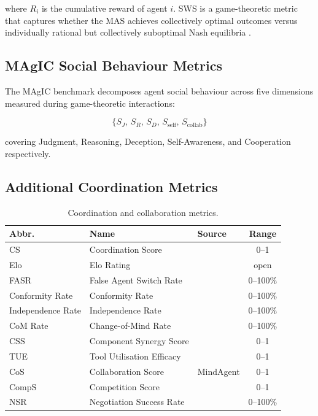 \documentclass[11pt,a4paper]{article}
\begin{document}
where $R_i$ is the cumulative reward of agent $i$. SWS is a game-theoretic metric that
captures whether the MAS achieves collectively optimal outcomes versus individually
rational but collectively suboptimal Nash equilibria \citep{game_theoretic_mas2025}.

\subsection{MAgIC Social Behaviour Metrics}

The MAgIC benchmark \citep{magic2023} decomposes agent social behaviour across five
dimensions measured during game-theoretic interactions:

\begin{equation}
  \{S_J,\, S_R,\, S_D,\, S_{\text{self}},\, S_{\text{collab}}\}
\end{equation}

covering Judgment, Reasoning, Deception, Self-Awareness, and Cooperation respectively.

\subsection{Additional Coordination Metrics}

\begin{table}[h!]
  \centering
  \caption{Coordination and collaboration metrics.}
  \label{tab:coord_metrics}
  \small
  \begin{tabular}{lllc}
    \toprule
    \textbf{Abbr.} & \textbf{Name} & \textbf{Source} & \textbf{Range} \\
    \midrule
    CS               & Coordination Score          & \citet{marble2025}          & 0--1      \\
    Elo              & Elo Rating                  & \citet{magic2023}           & open      \\
    FASR             & False Agent Switch Rate     & \citet{aws_bedrock2024}     & 0--100\%  \\
    Conformity Rate  & Conformity Rate             & \citet{benchform2025}       & 0--100\%  \\
    Independence Rate& Independence Rate           & \citet{benchform2025}       & 0--100\%  \\
    CoM Rate         & Change-of-Mind Rate         & \citet{collab_deliberate2025}& 0--100\% \\
    CSS              & Component Synergy Score     & \citet{trism2025}           & 0--1      \\
    TUE              & Tool Utilisation Efficacy   & \citet{trism2025}           & 0--1      \\
    CoS              & Collaboration Score         & MindAgent                   & 0--1      \\
    CompS            & Competition Score           & \citet{marble2025}          & 0--1      \\
    NSR              & Negotiation Success Rate    & \citet{marble2025}          & 0--100\%  \\
    \bottomrule
  \end{tabular}
\end{table}
\end{document}
